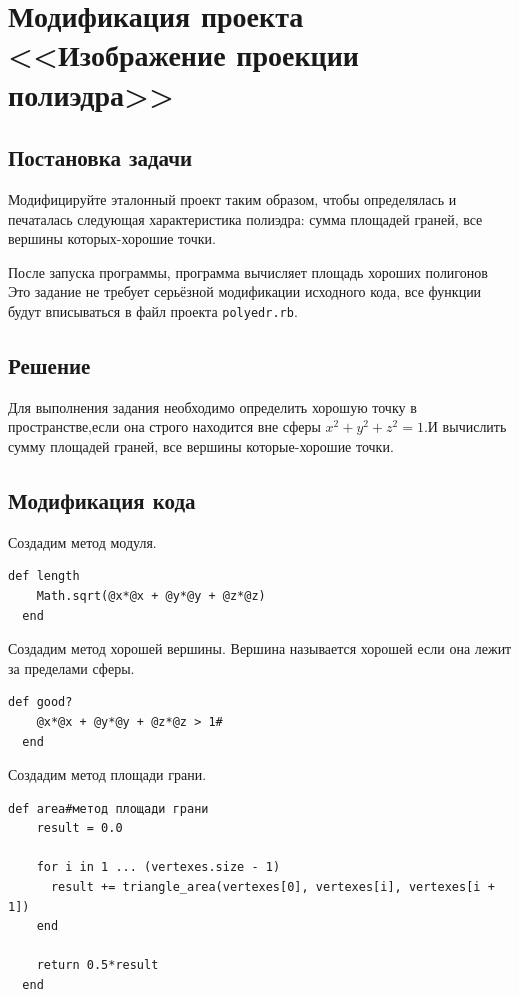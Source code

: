 \section{Модификация проекта <<Изображение проекции полиэдра>>}

\subsection{Постановка задачи}

Модифицируйте эталонный проект таким образом, чтобы определялась и печаталась следующая характеристика полиэдра: сумма площадей граней, все вершины которых-хорошие точки.

После запуска программы, программа вычисляет площадь хороших полигонов
Это задание не требует серьёзной модификации исходного кода, все функции будут вписываться в файл проекта \verb|polyedr.rb|.

\subsection{Решение}

Для выполнения задания необходимо определить хорошую точку в пространстве,если она строго находится вне сферы $x^2+y^2+z^2=1$.И вычислить сумму площадей граней, все вершины которые-хорошие точки.



\subsection{Модификация кода}

Создадим метод модуля.

\begin{small}
\begin{verbatim}
def length
    Math.sqrt(@x*@x + @y*@y + @z*@z)
  end
\end{verbatim}
\end{small}

Создадим метод хорошей вершины.
Вершина называется хорошей если она лежит за пределами сферы.

\begin{small}
\begin{verbatim}
def good?
    @x*@x + @y*@y + @z*@z > 1#
  end
\end{verbatim}
\end{small}

Создадим метод площади грани.

\begin{small}
\begin{verbatim}
def area#метод площади грани
    result = 0.0

    for i in 1 ... (vertexes.size - 1)
      result += triangle_area(vertexes[0], vertexes[i], vertexes[i + 1])
    end

    return 0.5*result
  end 
\end{verbatim}
\end{small}


